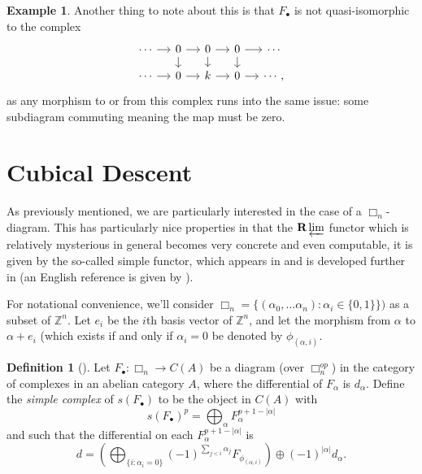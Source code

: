 \documentclass[proquest]{uwthesis}[2014/11/13]
\theoremstyle{definition}
\newtheorem{definition}[theorem]{Definition}
\newtheorem{example}[theorem]{Example}
\newcommand{\bR}{\textbf{R}}
\newcommand{\ZZ}{\mathbb{Z}}
\begin{document}
\begin{example}
	Another thing to note about this is that $F_\bullet$ is not quasi-isomorphic to the complex 
	\[
	\begin{tikzcd}[column sep = small, row sep = small]
	\cdots \ar[r] &  0 \ar[r] \ar[d] & 0 \ar{r} \ar{d} & 0 \ar[r] \ar[d] & \cdots \\
	\cdots \ar[r] & 0 \ar[r] & k \ar[r] & 0 \ar[r] & \cdots,
	\end{tikzcd}
	\]
	as any morphism to or from this complex runs into the same issue: some subdiagram commuting meaning the map must be zero.
\end{example}
	
\section{Cubical Descent}
\label{sec:cubicaldescent}

As previously mentioned, we are particularly interested in the case of a $\Box_n$-diagram.
This has particularly nice properties in that the $\bR \varprojlim$ functor which is relatively mysterious in general becomes very concrete and even computable, it is given by the so-called simple functor, which appears in \cite[I 6]{Guillen1988} and is developed further in \cite{Guillen2002} (an English reference is given by \cite{Pascual2009}).

For notational convenience, we'll consider $\Box_n = \{(\alpha_0, \dots \alpha_n) : \alpha_i \in \{0, 1\}\})$ as a subset of $\ZZ^n$.
Let $e_i$ be the $i$th basis vector of $\ZZ^n$, and let the morphism from $\alpha$ to $\alpha + e_i$ (which exists if and only if $\alpha_i = 0$ be denoted by $\phi_{(\alpha, i)}$.

\begin{definition}[{\cite[I 6]{Guillen1988}}]
	Let $F_\bullet : \Box_n \rightarrow C(A)$ be a diagram (over $\Box_n^{op}$) in the category of complexes in an abelian category $A$, where the differential of $F_\alpha$ is $d_\alpha$.
	Define the {\it simple complex} of $s(F_\bullet)$ to be the object in $C(A)$ with
	\[
	s(F_\bullet)^p = \bigoplus_\alpha F_\alpha^{p+1-|\alpha|}
	\] 
	and such that the differential on each $F_\alpha^{p+1-|\alpha|}$ is
	\[
	d = (\bigoplus_{\{i : \alpha_i = 0\}} (-1)^{\sum_{j < i} \alpha_j} F_{\phi_{(\alpha, i)}}) \oplus (-1)^{|\alpha|} d_\alpha.
	\]
\end{definition}
\end{document}

